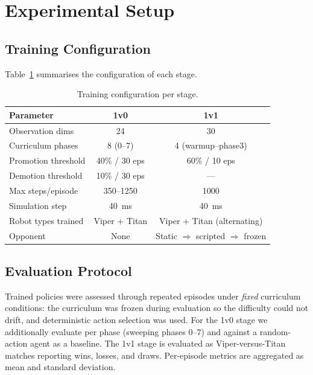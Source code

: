 \documentclass[conference]{IEEEtran}
\begin{document}
\section{Experimental Setup} \label{sec:setup}
\subsection{Training Configuration}
Table~\ref{tab:training_config} summarises the configuration of each stage.

\begin{table}[h]
    \centering
    \caption{Training configuration per stage.}
    \label{tab:training_config}
    \begin{tabular}{lcc}
        \hline
        \textbf{Parameter} & \textbf{1v0} & \textbf{1v1} \\
        \hline
        Observation dims       & 24             & 30 \\
        Curriculum phases      & 8 (0--7)       & 4 (warmup--phase3) \\
        Promotion threshold    & 40\% / 30 eps  & 60\% / 10 eps \\
        Demotion threshold     & 10\% / 30 eps  & --- \\
        Max steps/episode      & 350--1250      & 1000 \\
        Simulation step        & \SI{40}{ms}    & \SI{40}{ms} \\
        Robot types trained    & Viper + Titan  & Viper + Titan (alternating) \\
        Opponent               & None           & Static $\Rightarrow$ scripted $\Rightarrow$ frozen \\
        \hline
    \end{tabular}
\end{table}

\subsection{Evaluation Protocol}
Trained policies were assessed through repeated episodes under \emph{fixed}
curriculum conditions: the curriculum was frozen during evaluation so the
difficulty could not drift, and deterministic action selection was used. For the
1v0 stage we additionally evaluate per phase (sweeping phases 0--7) and against a
random-action agent as a baseline. The 1v1 stage is evaluated as Viper-versus-Titan
matches reporting wins, losses, and draws. Per-episode metrics are aggregated as
mean and standard deviation.
\end{document}
